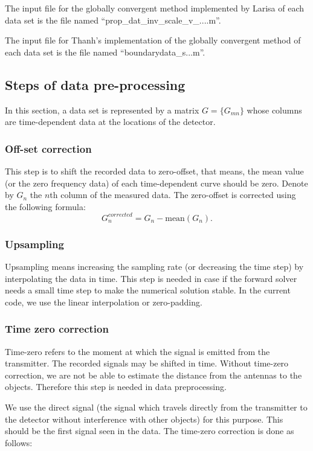 \documentclass[a4paper,12pt]{article}
\begin{document}
The input file for the globally convergent method implemented by Larisa of each data set is the file named ``prop\_dat\_inv\_scale\_v\_....m''. 

The input file for Thanh's implementation of the globally convergent method of each data set is the file named ``boundarydata\_s...m''. 

\subsection{Steps of data pre-processing}\label{sec:3}

In this section, a data set is represented by a matrix $G = \{G_{mn}\}$ whose columns are time-dependent data at the locations of the detector. 

\subsubsection{Off-set correction}

This step is to shift the recorded data to zero-offset, that means, the mean value (or the zero frequency data) of each time-dependent curve should be zero. Denote by $G_{n}$ the $n$th column of the measured data. The zero-offset is corrected using the following formula:
$$
G^{corrected}_{n} = G_{n} - \text{mean}  (G_{n}).
$$

\subsubsection{Upsampling}
Upsampling means increasing the sampling rate (or decreasing the time step) by interpolating the data in time. This step is needed in case if the forward solver needs a small time step to make the numerical solution stable. In the current code, we use the linear interpolation or zero-padding. 


\subsubsection{Time zero correction}

Time-zero refers to the moment at which the signal is emitted from the transmitter. The recorded
signals may be shifted in time. Without time-zero correction, we are not be able to estimate the distance from the antennas to the objects. Therefore this step is needed in data preprocessing. 

We use the direct signal (the signal which travels directly from the transmitter to the detector without interference with other objects) for this purpose. This should be the first signal seen in the data. The time-zero correction is done as follows:
\end{document}
